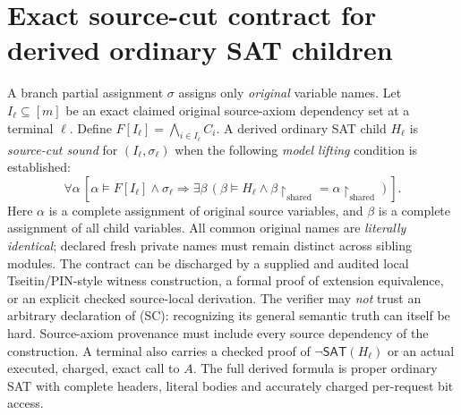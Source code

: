 \documentclass[11pt]{article}
\newcommand{\SAT}{\mathsf{SAT}}
\begin{document}
\section{Exact source-cut contract for derived ordinary SAT children}
A branch partial assignment $\sigma$ assigns only \emph{original}
variable names. Let $I_\ell\subseteq[m]$ be an exact claimed original
source-axiom dependency set at a terminal $\ell$. Define
$F[I_\ell]=\bigwedge_{i\in I_\ell}C_i$. A derived ordinary
SAT child $H_\ell$ is \emph{source-cut sound} for $(I_\ell,\sigma_\ell)$
when the following \emph{model lifting} condition is established:
\[
\boxed{\quad
\forall\alpha\,[\alpha\models F[I_\ell]\land\sigma_\ell
 \Rightarrow\exists\beta\,
  (\beta\models H_\ell\land
  \beta\!\upharpoonright_{\mathrm{shared}}=
  \alpha\!\upharpoonright_{\mathrm{shared}})] .\quad} \tag{SC}
\]
Here $\alpha$ is a complete assignment of original source variables,
and $\beta$ is a complete assignment of all child variables. All
common original names are \emph{literally identical}; declared
fresh private names must remain distinct across sibling modules.
The contract can be discharged by a supplied and audited local
Tseitin/PIN-style witness construction, a formal proof of
extension equivalence, or an explicit checked source-local
derivation. The verifier may \emph{not} trust an arbitrary declaration
of (SC): recognizing its general semantic truth can itself be hard.
Source-axiom provenance must include every source dependency of the
construction. A terminal also carries a checked proof of
$\neg\SAT(H_\ell)$ or an actual executed, charged, exact call to $A$.
The full derived formula is proper ordinary SAT with complete
headers, literal bodies and accurately charged per-request bit access.
\end{document}
